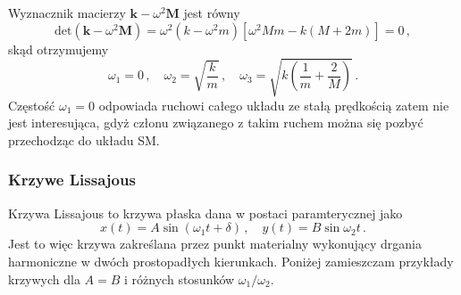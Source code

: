 \documentclass[../main.tex]{subfiles}
\begin{document}
        Wyznacznik macierzy \(\mathbf{k}-\omega^2\mathbf{M}\) jest równy
        \begin{equation*}
            \text{det}(\mathbf{k}-\omega^2\mathbf{M})=\omega^2(k-\omega^2m)\left[\omega^2Mm-k(M+2m)\right]=0\,,
        \end{equation*}
        skąd otrzymujemy
        \begin{equation*}
            \omega_1=0\,,\quad\omega_2=\sqrt{\frac{k}{m}}\,,\quad\omega_3=\sqrt{k\left(\frac{1}{m}+\frac{2}{M}\right)}\,.
        \end{equation*}
        Częstość \(\omega_1=0\) odpowiada ruchowi całego układu ze stałą prędkością zatem nie jest
        interesująca, gdyż członu związanego z takim ruchem można się pozbyć przechodząc do układu
        SM.
        \subsubsection{Krzywe Lissajous}
        Krzywa Lissajous to krzywa płaska dana w postaci paramterycznej jako
        \begin{equation*}
            x(t)=A\sin(\omega_1t+\delta)\,,\quad y(t)=B\sin\omega_2t\,.
        \end{equation*}
        Jest to więc krzywa zakreślana przez punkt materialny wykonujący drgania harmoniczne w dwóch
        prostopadłych kierunkach. Poniżej zamieszczam przykłady krzywych dla \(A=B\) i różnych
        stosunków \(\omega_1/\omega_2\).
        
\end{document}

